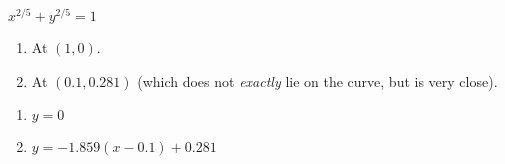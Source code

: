 {$x^{2/5}+y^{2/5} = 1$
\begin{enumerate}
\item	At $(1,0)$.
\item	At $(0.1,0.281)$ (which does not \textit{exactly} lie on the curve, but is very close).
\end{enumerate}
}
{\begin{enumerate}
\item	$y=0$
\item	$y = -1.859(x-0.1)+0.281$
\end{enumerate}
}
